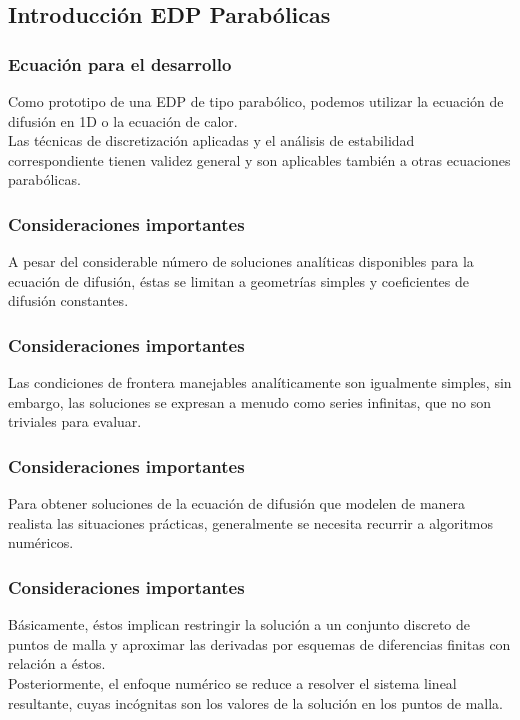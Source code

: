 \subsection{Introducción EDP Parabólicas}
\begin{frame}
\frametitle{Ecuación para el desarrollo}
Como prototipo de una EDP de tipo parabólico, podemos utilizar  la ecuación de difusión en 1D o la ecuación de calor.
\\
\bigskip
Las técnicas de discretización aplicadas y el análisis de estabilidad correspondiente tienen validez general y son aplicables también a otras ecuaciones parabólicas.
\end{frame}
\begin{frame}
\frametitle{Consideraciones importantes}
A pesar del considerable número de soluciones analíticas disponibles para la ecuación de difusión, éstas se limitan a geometrías simples y coeficientes de difusión constantes.
\end{frame}
\begin{frame}
\frametitle{Consideraciones importantes}
Las condiciones de frontera manejables analíticamente son igualmente simples, sin embargo, las soluciones se expresan a menudo como series infinitas, que no son triviales para evaluar.
\end{frame}
\begin{frame}
\frametitle{Consideraciones importantes}
Para obtener soluciones de la ecuación de difusión que modelen de manera realista las situaciones prácticas, generalmente se necesita recurrir a algoritmos numéricos.
\end{frame}
\begin{frame}
\frametitle{Consideraciones importantes}
Básicamente, éstos implican restringir la solución a un conjunto discreto de puntos de malla y aproximar las derivadas por esquemas de diferencias finitas con relación a éstos.
\\
\bigskip
Posteriormente, el enfoque numérico se reduce a resolver el sistema lineal resultante, cuyas incógnitas son los valores de la solución en los puntos de malla.
\end{frame}
